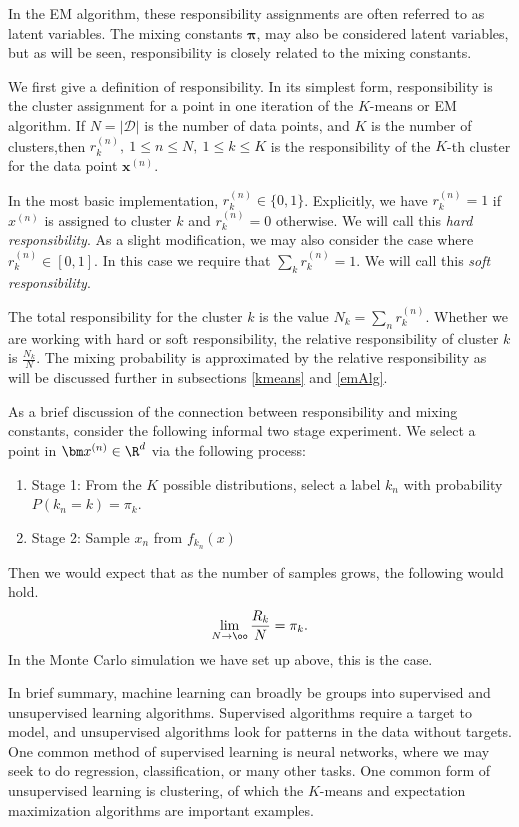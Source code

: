 In the EM algorithm, these responsibility assignments are often referred to as 
latent variables. The mixing constants $\bm\pi$, may also be considered latent 
variables, but as will be seen, responsibility is closely related to the 
mixing constants.

We first give a definition of responsibility.  In its simplest form, 
responsibility is the cluster assignment for a point in one iteration of the 
$K$-means or EM algorithm. If $N = |\mathcal{D}|$ is the number of data 
points, and  $K$ is the number of clusters,then 
$r^{(n)}_k,\ 1\leq n\leq N,\ 1\leq k\leq K$ is the responsibility of the 
$K$-th cluster for the data point $\bm x^{(n)}$.  

In the most basic implementation, $r^{(n)}_k \in \{0,1\}$. Explicitly, we have 
$r^{(n)}_k=1$ if $x^{(n)}$ is assigned to cluster $k$ and $r^{(n)}_k = 0$ 
otherwise. We will call this \textit{hard responsibility}. As a slight 
modification, we may also consider the case where $r^{(n)}_k \in [0,1]$. In 
this case we require that $\sum_k r^{(n)}_k = 1$. We will call this 
\textit{soft responsibility}.
 
The total responsibility for the cluster $k$ is the value 
$N_k = \sum_n r^{(n)}_k$.
Whether we are working with hard or soft responsibility, the relative 
responsibility of cluster $k$ is $\frac{N_k}{N}$.  The mixing probability is 
approximated by the relative responsibility as will be discussed further in 
subsections \ref{kmeans} and \ref{emAlg}.

As a brief discussion of the connection between responsibility and mixing 
constants, consider the following informal two stage experiment.  We select a 
point in $\bm x^{(n)}\in\R^d$ via the following process:
\begin{enumerate}
\item Stage 1: From the $K$ possible distributions, select a label $k_n$ with 
probability $P(k_n=k)=\pi_{k}$.
\item Stage 2: Sample $x_n$ from $f_{k_n}(x)$
\end{enumerate}
Then we would expect that as the number of samples grows, the following would
hold. \[\lim_{N\rightarrow\oo}\frac{R_k}{N} = \pi_k.\] 
In the Monte Carlo simulation we have set up above, this is the case.

In brief summary, machine learning can broadly be groups into supervised and 
unsupervised learning algorithms.  Supervised algorithms require a target to 
model, and unsupervised algorithms look for patterns in the data without 
targets.  One common method of supervised learning is neural networks, where 
we may seek to do regression, classification, or many other tasks.  One common 
form of unsupervised learning is clustering, of which the \(K\)-means and 
expectation maximization algorithms are important examples.
